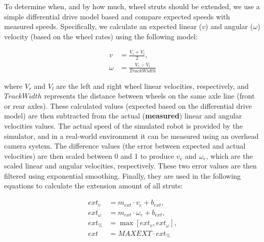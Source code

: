 To determine when, and by how much, wheel struts should be extended, we use a simple differential drive model based and compare expected speeds with measured speeds. Specifically, we calculate an expected linear ($v$) and angular ($\omega$) velocity (based on the wheel rates) using the following model:

%


\begin{align}
  v &= \frac{V_r + V_l}{2},\\
  \omega &= \frac{V_r - V_l}{\mathit{TrackWidth}}
\end{align}

\noindent
where $V_r$ and $V_l$ are the left and right wheel linear velocities,
respectively, and $\mathit{TrackWidth}$ represents the distance between wheels on the same axle line (front or rear axles).
%
%
%
These calculated values (expected based on the differential drive model) are then subtracted from the actual (\textbf{measured}) linear and angular velocities values.
%
The actual speed of the simulated robot is provided by the simulator, and in a real-world environment it can be measured using an overhead camera system.
%
The difference values (the error between expected and actual velocities) are then scaled between 0 and 1 to produce $v_e$ and $\omega_e$, which are the scaled linear and angular velocities, respectively.
%
These two error values are then filtered using exponential smoothing. Finally, they are used in the following equations to calculate the extension amount of all struts:


\begin{align}
    \mathit{ext}_v &= m_{\mathit{ext}} \cdot v_e + b_{\mathit{ext}},\\
    \mathit{ext}_\omega &= m_{\mathit{ext}} \cdot \omega_e + b_{\mathit{ext}},\\
    \mathit{ext}_\% &= \max[\mathit{ext}_v, \mathit{ext}_\omega],\\
    \mathit{ext} &= \mathit{MAXEXT} \cdot \mathit{ext}_\%
\end{align}


